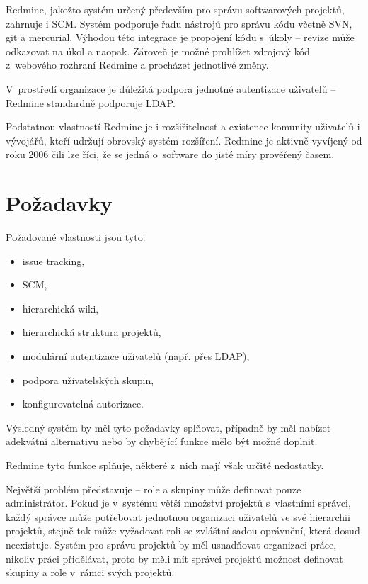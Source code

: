 \documentclass[thesis=B,czech]{FITthesis}[2012/05/02]
\begin{document}
Redmine, jakožto systém určený především pro správu softwarových
projektů, zahrnuje i \gls{SCM}. Systém podporuje řadu nástrojů pro
správu kódu včetně \gls{SVN}, \gls{git} a \gls{mercurial}. Výhodou této
integrace je propojení kódu s~úkoly -- revize může odkazovat na úkol a
naopak. Zároveň je možné prohlížet zdrojový kód z~webového rozhraní
Redmine a procházet jednotlivé změny.

V~prostředí organizace je důležitá podpora jednotné autentizace
uživatelů -- Redmine standardně podporuje \gls{LDAP}.

Podstatnou vlastností Redmine je i rozšiřitelnost a existence komunity
uživatelů i vývojářů, kteří udržují obrovský systém rozšíření. Redmine
je aktivně vyvíjený od roku 2006 čili lze říci, že se jedná o~software
do jisté míry prověřený časem.

\section{Požadavky}

Požadované vlastnosti jsou tyto:

\begin{itemize}
\item
  issue tracking,
\item
  \gls{SCM},
\item
  hierarchická wiki,
\item
  hierarchická struktura projektů,
\item
  modulární autentizace uživatelů (např. přes \gls{LDAP}),
\item
  podpora uživatelských skupin,
\item
  konfigurovatelná autorizace.
\end{itemize}
Výsledný systém by měl tyto požadavky splňovat, případně by měl nabízet
adekvátní alternativu nebo by chybějící funkce mělo být možné doplnit.

Redmine tyto funkce splňuje, některé z~nich mají však určité nedostatky.

Největší problém představuje  -- role a skupiny může definovat
pouze administrátor. Pokud je v~systému větší množství projektů
s~vlastními správci, každý správce může potřebovat jednotnou organizaci
uživatelů ve své hierarchii projektů, stejně tak může vyžadovat roli se
zvláštní sadou oprávnění, která dosud neexistuje. Systém pro správu
projektů by měl usnadňovat organizaci práce, nikoliv práci přidělávat,
proto by měli mít správci projektů možnost definovat skupiny a role
v~rámci svých projektů.
\end{document}
